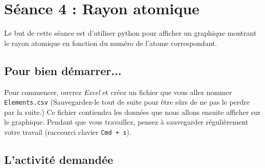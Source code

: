 
%
%
%
%

\chapter{Séance 4 : Rayon atomique}\label{ficheTableur4e1}

Le but de cette séance est d'utiliser python pour afficher un graphique montrant le rayon atomique en fonction du numéro de l'atome correspondant.

\section{Pour bien démarrer...}

Pour commencer, ouvrez \emph{Excel} et créez un fichier que vous allez nommer \texttt{Elements.csv} (Sauvegardez-le tout de suite pour être sûrs de ne pas le perdre par la suite.) Ce fichier contiendra les données que nous allons ensuite afficher sur le graphique. Pendant que vous travaillez, pensez à sauvegarder régulièrement votre travail (raccourci clavier \texttt{Cmd + s}).   



\section{L'activité demandée}


